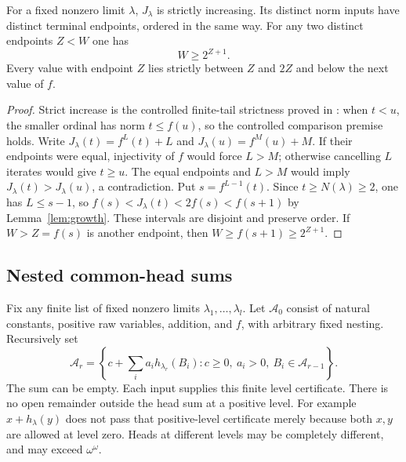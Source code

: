 \documentclass[11pt]{article}
\begin{document}
\begin{lemma}\label{lem:endpoints}
For a fixed nonzero limit $\lambda$, $J_\lambda$ is strictly increasing.
Its distinct norm inputs have distinct terminal endpoints, ordered in the
same way. For any two distinct endpoints $Z<W$ one has
\begin{equation}\label{eq:sparse}
 W\ge2^{Z+1}.
\end{equation}
Every value with endpoint $Z$ lies strictly between $Z$ and $2Z$ and below
the next value of $f$.
\end{lemma}
\begin{proof}
Strict increase is the controlled finite-tail strictness proved in
\cite{wwfoundations}: when $t<u$, the smaller ordinal has norm
$t\le f(u)$, so the controlled comparison premise holds. Write
$J_\lambda(t)=f^L(t)+L$ and $J_\lambda(u)=f^M(u)+M$.
If their endpoints were equal, injectivity of $f$ would force $L>M$;
otherwise cancelling $L$ iterates would give $t\ge u$. The equal endpoints
and $L>M$ would imply $J_\lambda(t)>J_\lambda(u)$, a contradiction.
Put $s=f^{L-1}(t)$. Since $t\ge N(\lambda)\ge2$, one has $L\le s-1$,
so $f(s)<J_\lambda(t)<2f(s)<f(s+1)$ by Lemma~\ref{lem:growth}.
These intervals are disjoint and preserve order. If $W>Z=f(s)$ is another
endpoint, then $W\ge f(s+1)\ge2^{Z+1}$.
\end{proof}

\subsection{Nested common-head sums}
Fix any finite list of fixed nonzero limits $\lambda_1,\ldots,\lambda_l$.
Let $\mathcal A_0$ consist of natural constants, positive raw variables,
addition, and $f$, with arbitrary fixed nesting. Recursively set
\begin{equation}\label{eq:common-class}
 \mathcal A_r=\left\{c+\sum_i a_i h_{\lambda_r}(B_i):
 c\ge0,\ a_i>0,\ B_i\in\mathcal A_{r-1}\right\}.
\end{equation}
The sum can be empty. Each input supplies this finite level certificate.
There is no open remainder outside the head sum at a positive level.
For example $x+h_\lambda(y)$ does not pass that positive-level certificate
merely because both $x,y$ are allowed at level zero. Heads at different
levels may be completely different, and may exceed $\omega^\omega$.
\end{document}
